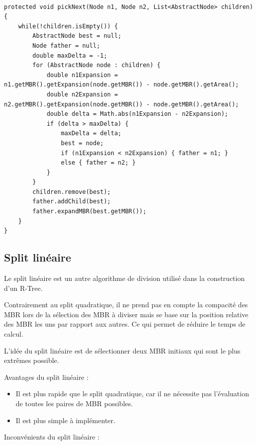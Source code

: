 \documentclass {article}
\begin{document}
\begin{verbatim}

protected void pickNext(Node n1, Node n2, List<AbstractNode> children) {
    while(!children.isEmpty()) {
        AbstractNode best = null;
        Node father = null;
        double maxDelta = -1;
        for (AbstractNode node : children) {
            double n1Expansion = n1.getMBR().getExpansion(node.getMBR()) - node.getMBR().getArea();
            double n2Expansion = n2.getMBR().getExpansion(node.getMBR()) - node.getMBR().getArea();
            double delta = Math.abs(n1Expansion - n2Expansion);
            if (delta > maxDelta) {
                maxDelta = delta;
                best = node;
                if (n1Expansion < n2Expansion) { father = n1; }
                else { father = n2; }
            }
        }
        children.remove(best);
        father.addChild(best);
        father.expandMBR(best.getMBR());
    }
}
\end{verbatim}



\subsection {Split linéaire}

Le split linéaire est un autre algorithme de division utilisé dans la construction d'un R-Tree.

Contrairement au split quadratique, il ne prend pas en compte la compacité des MBR lors de la
sélection des MBR à diviser mais se base sur la position relative des MBR les uns par rapport
aux autres.
Ce qui permet de réduire le temps de calcul.

L'idée du split linéaire est de sélectionner deux MBR initiaux qui sont le plus extrêmes possible.

Avantages du split linéaire :

\begin{itemize}
    \item Il est plus rapide que le split quadratique, car il ne nécessite pas l'évaluation de
	toutes les paires de MBR possibles.
    \item Il est plus simple à implémenter.

\end{itemize}
Inconvénients du split linéaire :
\end{document}
